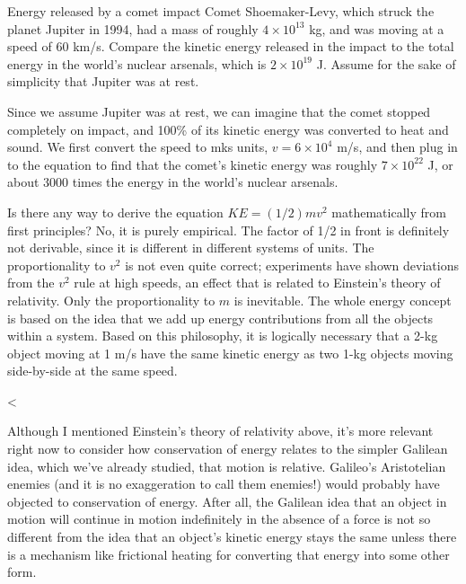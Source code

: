 \begin{eg}{Energy released by a comet impact}
\egquestion Comet Shoemaker-Levy, which struck the planet
Jupiter in 1994, had a mass of roughly $4\times10^{13}$ kg,
and was moving at a speed of 60 km/s. Compare the kinetic
energy released in the impact to the total energy in the
world's nuclear arsenals, which is $2\times10^{19}$ J. Assume
for the sake of simplicity that Jupiter was at rest.

\eganswer Since we assume Jupiter was at rest, we can
imagine that the comet stopped completely on impact, and
100\% of its kinetic energy was converted to heat and sound.
We first convert the speed to mks units, $v=6\times10^4$
m/s, and then plug in to the equation to find that the
comet's kinetic energy was roughly $7\times10^{22}$ J, or about
3000 times the energy in the world's nuclear arsenals.
\end{eg}

Is there any way to derive the equation $KE=(1/2)mv^2$
mathematically from first principles? No, it is purely
empirical. The factor of 1/2 in front is definitely not
derivable, since it is different in different systems of
units. The proportionality to $v^2$ is not even quite
correct; experiments have shown deviations from the $v^2$
rule at high speeds, an effect that is related to Einstein's
theory of relativity. Only the proportionality to $m$ is
inevitable. The whole energy concept is based on the idea
that we add up energy contributions from all the objects
within a system. Based on this philosophy, it is logically
necessary that a 2-kg object moving at 1 m/s have the same
kinetic energy as two 1-kg objects moving side-by-side at the same speed.

<%

Although I mentioned Einstein's theory of relativity above,
it's more relevant right now to consider how conservation of
energy relates to the simpler Galilean idea, which we've
already studied, that motion is relative. Galileo's
Aristotelian enemies (and it is no exaggeration to call them
enemies!) would probably have objected to conservation of
energy. After all, the Galilean idea that an object in
motion will continue in motion indefinitely in the absence
of a force is not so different from the idea that an
object's kinetic energy stays the same unless there is a
mechanism like frictional heating for converting that energy
into some other form.

